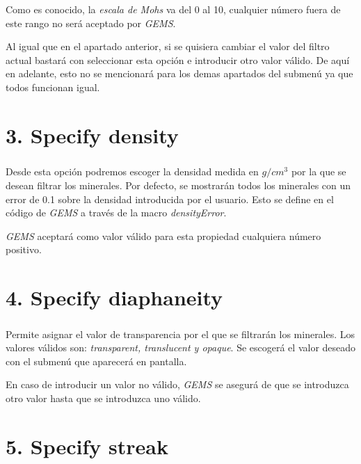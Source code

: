 \documentclass[a4paper,10pt]{article}
\begin{document}
Como es conocido, la \textit{escala de Mohs} va del 0 al 10, cualquier número fuera de este rango no será aceptado por \textit{GEMS}.

Al igual que en el apartado anterior, si se quisiera cambiar el valor del filtro actual bastará con seleccionar esta opción e introducir otro valor válido. De aquí en adelante, esto no se mencionará para los demas apartados del submenú ya que todos funcionan igual.
\setlength{\parskip}{1em}\\

\chapter{3. Specify density}
\setlength{\parskip}{0.5em}
\paragraph{}Desde esta opción podremos escoger la densidad medida en \textit{$g/cm^3$} por la que se desean filtrar los minerales. Por defecto, se mostrarán todos los minerales con un error de 0.1 sobre la densidad introducida por el usuario. Esto se define en el código de \textit{GEMS} a través de la macro \textit{densityError}.

\textit{GEMS} aceptará como valor válido para esta propiedad cualquiera número positivo.
\setlength{\parskip}{1em}\\

\chapter{4. Specify diaphaneity}
\setlength{\parskip}{0.5em}
\paragraph{}Permite asignar el valor de transparencia por el que se filtrarán los minerales. Los valores válidos son: \textit{transparent, translucent y opaque}. Se escogerá el valor deseado con el submenú que aparecerá en pantalla.

En caso de introducir un valor no válido, \textit{GEMS} se asegurá de que se introduzca otro valor hasta que se introduzca uno válido.
\setlength{\parskip}{1em}\\

\chapter{5. Specify streak}
\setlength{\parskip}{0.5em}
\end{document}
